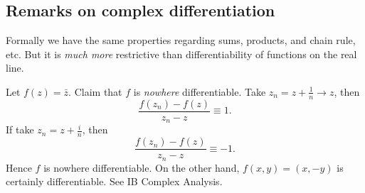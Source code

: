 \subsection{Remarks on complex differentiation}
Formally we have the same properties regarding sums, products, and chain rule, etc. But it is \textit{much more} restrictive than differentiability of functions on the real line.

\begin{example}
    Let $ f(z) = \bar{z} $. Claim that $f$ is \textit{nowhere} differentiable. Take $ z_n=z+\frac{1}{n}\to z $, then 
    \[
        \frac{f(z_n)-f(z)}{z_n-z}\equiv 1.
    \]
    If take $ z_n = z+\frac{i}{n} $, then 
    \[
        \frac{f(z_n)-f(z)}{z_n-z}\equiv -1.
    \]
    Hence $f$ is nowhere differentiable. On the other hand, $ f(x,y)= (x,-y) $ is certainly differentiable. See IB Complex Analysis.
\end{example}